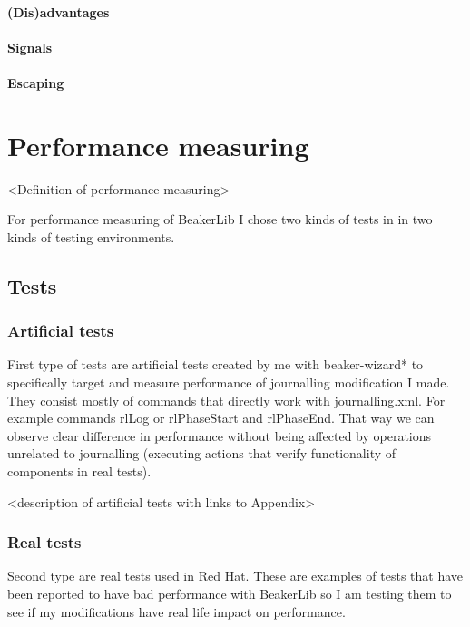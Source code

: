 \subsubsection{(Dis)advantages}

\subsubsection{Signals}

\subsubsection{Escaping}



\chapter{Performance measuring}
<Definition of performance measuring>

For performance measuring of BeakerLib I chose two kinds of tests in in two kinds of testing environments.

\section{Tests}

\subsection{Artificial tests}
First type of tests are artificial tests created by me with beaker-wizard* to specifically target and measure performance of journalling modification I made. They consist mostly of commands that directly work with journalling.xml. For example commands rlLog or rlPhaseStart and rlPhaseEnd. That way we can observe clear difference in performance without being affected by operations unrelated to journalling (executing actions that verify functionality of components in real tests). 

<description of artificial tests with links to Appendix>

\subsection{Real tests}
Second type are real tests used in Red Hat. These are examples of tests that have been reported to have bad performance with BeakerLib so I am testing them to see if my modifications have real life impact on performance.

